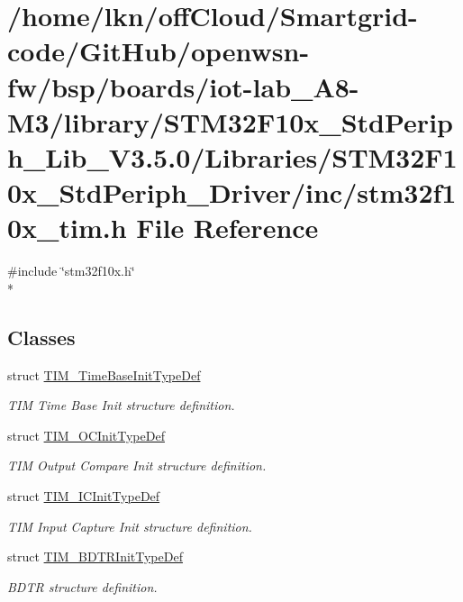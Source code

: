 \hypertarget{iot-lab___a8-_m3_2library_2_s_t_m32_f10x___std_periph___lib___v3_85_80_2_libraries_2_s_t_m32_f10136973e75d85ae0f58fe1d2aa156247f}{}\section{/home/lkn/off\+Cloud/\+Smartgrid-\/code/\+Git\+Hub/openwsn-\/fw/bsp/boards/iot-\/lab\+\_\+\+A8-\/\+M3/library/\+S\+T\+M32\+F10x\+\_\+\+Std\+Periph\+\_\+\+Lib\+\_\+\+V3.5.0/\+Libraries/\+S\+T\+M32\+F10x\+\_\+\+Std\+Periph\+\_\+\+Driver/inc/stm32f10x\+\_\+tim.h File Reference}
\label{iot-lab___a8-_m3_2library_2_s_t_m32_f10x___std_periph___lib___v3_85_80_2_libraries_2_s_t_m32_f10136973e75d85ae0f58fe1d2aa156247f}
{\ttfamily \#include \char`\"{}stm32f10x.\+h\char`\"{}}\\*
\subsection*{Classes}
\begin{DoxyCompactItemize}
\item 
struct \hyperlink{struct_t_i_m___time_base_init_type_def}{T\+I\+M\+\_\+\+Time\+Base\+Init\+Type\+Def}
\begin{DoxyCompactList}\small\item\em T\+IM Time Base Init structure definition. \end{DoxyCompactList}\item 
struct \hyperlink{struct_t_i_m___o_c_init_type_def}{T\+I\+M\+\_\+\+O\+C\+Init\+Type\+Def}
\begin{DoxyCompactList}\small\item\em T\+IM Output Compare Init structure definition. \end{DoxyCompactList}\item 
struct \hyperlink{struct_t_i_m___i_c_init_type_def}{T\+I\+M\+\_\+\+I\+C\+Init\+Type\+Def}
\begin{DoxyCompactList}\small\item\em T\+IM Input Capture Init structure definition. \end{DoxyCompactList}\item 
struct \hyperlink{struct_t_i_m___b_d_t_r_init_type_def}{T\+I\+M\+\_\+\+B\+D\+T\+R\+Init\+Type\+Def}
\begin{DoxyCompactList}\small\item\em B\+D\+TR structure definition. \end{DoxyCompactList}\end{DoxyCompactItemize}
